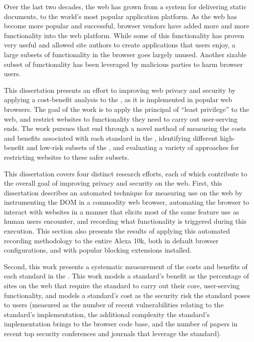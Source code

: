 \summary
Over the last two decades, the web has grown from a system for delivering
static documents, to the world's most popular application platform.  As the
web has become more popular and successful, browser vendors have added more
and more functionality into the web platform.
While some of this functionality has proven very useful and allowed site
authors to create applications that users enjoy, a large subsets of functionality
in the browser goes largely unused.  Another sizable subset of functionality
has been leveraged by malicious parties to harm browser users.

This dissertation presents an effort to improving web privacy and security
by applying a cost-benefit analysis to the \WAPI, as it is implemented in
popular web browsers.  The goal of the work is to apply the principal of
``least privilege'' to the web, and restrict websites to functionality
they need to carry out user-serving ends.  The work pursues that
end through a novel method of measuring the costs and benefits associated with
each standard in the \WAPI, identifying different high-benefit and low-risk
subsets of the \WAPI, and evaluating a variety of approaches for
restricting websites to these safer subsets.

This dissertation covers four distinct research efforts, each of which contribute
to the overall goal of improving privacy and security on the web.  First,
this dissertation describes an automated technique for measuring \WAPI use on the web by
instrumenting the DOM in a commodity web browser, automating the browser
to interact with websites in a manner that elicits most of the same
feature use as human users encounter, and recording what functionality is
triggered during this execution.  This section also presents the results of
applying this automated recording methodology to the entire Alexa 10k, both
in default browser configurations, and with popular blocking extensions installed.

Second, this work presents a systematic measurement of the costs and benefits of
each standard in the \WAPI.  This work models a standard's benefit
as the percentage of sites on the web that require the standard to carry out
their core, user-serving functionality, and models a standard's cost as
the security risk the standard poses to users (measured as the number of
recent vulnerabilities relating to the standard's implementation, the additional
complexity the standard's implementation brings to the browser code base, and
the number of papers in recent top security conferences and journals that
leverage the standard).

